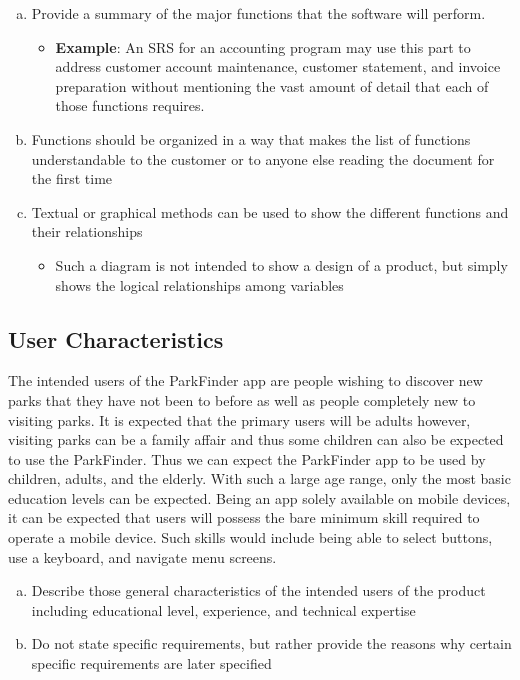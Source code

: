 \documentclass[]{article}
\begin{document}
\color{red}
\begin{enumerate}[a)]
	\item Provide a summary of the major functions that the software will perform.
	\begin{itemize}
        \item \textbf{Example}: An SRS for an accounting program may use this part to address
        customer account maintenance, customer statement, and invoice preparation without mentioning
        the vast amount of detail that each of those functions requires.
	\end{itemize}
    \item Functions should be organized in a way that makes the list of functions understandable to
    the customer or to anyone else reading the document for the first time
    \item Textual or graphical methods can be used to show the different functions and their
    relationships
	\begin{itemize}
        \item Such a diagram is not intended to show a design of a product, but simply shows the
        logical relationships among variables
	\end{itemize} 
\end{enumerate}
\color{black}

\subsection{User Characteristics}%
\label{sub:user_characteristics}
The intended users of the ParkFinder app are people wishing to discover new parks that they have not
been to before as well as people completely new to visiting parks. It is expected that the primary
users will be adults however, visiting parks can be a family affair and thus some children can also
be expected to use the ParkFinder. Thus we can expect the ParkFinder app to be used by children,
adults, and the elderly. With such a large age range, only the most basic education levels can be
expected. Being an app solely available on mobile devices, it can be expected that users will
possess the bare minimum skill required to operate a mobile device. Such skills would include being
able to select buttons, use a keyboard, and navigate menu screens.


\color{red}
\begin{enumerate}[a)]
	\item Describe those general characteristics of the intended users of the product including
	educational level, experience, and technical expertise
	\item Do not state specific requirements, but rather provide the reasons why certain specific
	requirements are later specified
\end{enumerate}
\color{black}
\end{document}
